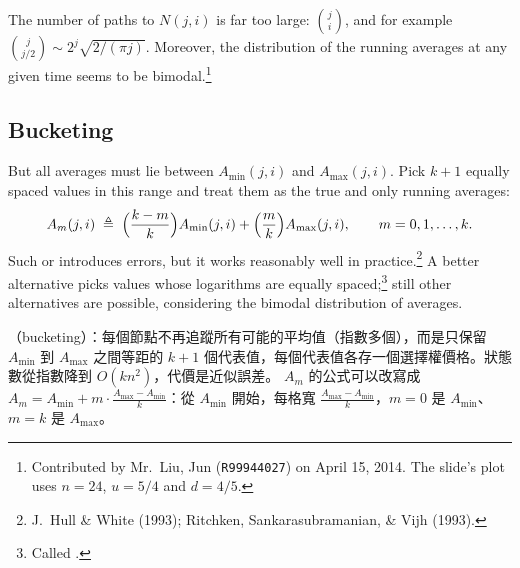 \suppstart
{}
\suppend


The number of paths to $N(j,i)$ is far too large: $\binom{j}{i}$, and for example $\binom{j}{j/2}\sim2^{j}\sqrt{2/(\pi j)}$.
Moreover, the distribution of the running averages at any given time seems to be bimodal.\footnote{Contributed by Mr.~Liu, Jun (\texttt{R99944027}) on April 15, 2014. The slide's plot uses $n=24$, $u=5/4$ and $d=4/5$.}

\suppstart
{}
\suppend

\subsection{Bucketing}


But all averages must lie between $A_{\min}(j,i)$ and $A_{\max}(j,i)$.
Pick $k+1$ equally spaced values in this range and treat them as the true and only running averages:
\[
	A_{m}(j,i) \;\triangleq\; \Bigl(\frac{k-m}{k}\Bigr)A_{\min}(j,i)+\Bigl(\frac{m}{k}\Bigr)A_{\max}(j,i) ,
	\qquad m=0,1,\ldots,k .
\]
Such  or  introduces errors, but it works reasonably well in practice.\footnote{J.~Hull \& White (1993); Ritchken, Sankarasubramanian, \& Vijh (1993).}
A better alternative picks values whose logarithms are equally spaced;\footnote{Called .} still other alternatives are possible, considering the bimodal distribution of averages.

\suppstart
{}

\begin{remark}
	（bucketing）：每個節點不再追蹤所有可能的平均值（指數多個），而是只保留 $A_{\min}$ 到 $A_{\max}$ 之間等距的 $k+1$ 個代表值，每個代表值各存一個選擇權價格。狀態數從指數降到 $O(kn^{2})$，代價是近似誤差。
	$A_{m}$ 的公式可以改寫成 $A_{m}=A_{\min}+m\cdot\frac{A_{\max}-A_{\min}}{k}$：從 $A_{\min}$ 開始，每格寬 $\frac{A_{\max}-A_{\min}}{k}$，$m=0$ 是 $A_{\min}$、$m=k$ 是 $A_{\max}$。
\end{remark}
\suppend


